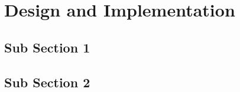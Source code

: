\chapter{Design and Implementation}
    \lipsum[2-3]

    \section{Sub Section 1}
    \lipsum[2-4]
    
    \section{Sub Section 2}

    \lipsum[2]